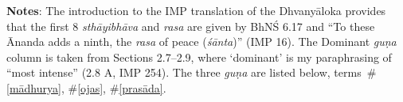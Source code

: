 \documentclass[10pt]{article}
\begin{document}
\textbf{Notes}: The introduction to the IMP translation of the Dhvanyāloka provides that the first 8 \textit{sthāyibhāva} and \textit{rasa} are given by BhNŚ 6.17 and ``To these Ānanda adds a ninth, the \textit{rasa} of peace (\textit{śānta})'' (IMP 16). The Dominant \textit{guṇa} column is taken from Sections 2.7--2.9, where `dominant' is my paraphrasing of ``most intense'' (2.8 A, IMP 254). The three \textit{guṇa} are listed below, terms~\#\ref{mādhurya}, \#\ref{ojas}, \#\ref{prasāda}.



\newcommand\litem[1]{\item{\bfseries #1\label{#1}}}
\end{document}
